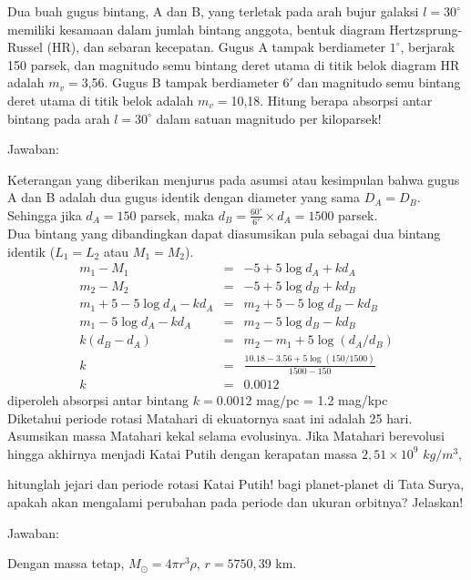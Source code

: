 \documentclass[11pt,fleqn]{exam}
\begin{document}
\begin{questions}
\question Dua buah gugus bintang, A dan B, yang terletak pada arah bujur galaksi $l = 30^{\circ}$ memiliki kesamaan dalam jumlah bintang anggota, bentuk diagram Hertzsprung-Russel (HR), dan sebaran kecepatan. Gugus A tampak berdiameter $1^{\circ}$, berjarak 150 parsek, dan magnitudo semu bintang deret utama di titik belok diagram HR adalah $m_v = $3,56. Gugus B tampak berdiameter $6'$ dan magnitudo semu bintang deret utama di titik belok adalah $m_v = $10,18. Hitung berapa absorpsi antar bintang pada arah $l = 30^{\circ}$ dalam satuan magnitudo per kiloparsek!

Jawaban:

Keterangan yang diberikan menjurus pada asumsi atau kesimpulan bahwa gugus A dan B adalah dua gugus identik dengan diameter yang sama $D_{A} = D_{B}$. Sehingga jika $d_{A} = 150$ parsek, maka $d_{B} = \frac{60'}{6'} \times d_{A} = 1500$ parsek.\\ 
Dua bintang yang dibandingkan dapat diasumsikan pula sebagai dua bintang identik ($L_1 = L_2$ atau $M_1 = M_2$).
\begin{eqnarray*}
m_1 - M_1 &=& -5 + 5 \log d_A + kd_A\\
m_2 - M_2 &=& -5 + 5 \log d_B + kd_B\\
m_1 + 5 - 5 \log d_A - kd_A &=& m_2 + 5 - 5 \log d_B - kd_B\\
m_1 - 5 \log d_A - kd_A &=& m_2 - 5 \log d_B - kd_B\\
k(d_B - d_A) &=& m_2 - m_1 + 5 \log (d_A/d_B)\\
k &=& \frac{10.18 - 3.56 + 5 \log (150/1500)}{1500-150}\\
k &=& 0.0012
\end{eqnarray*}
diperoleh absorpsi antar bintang $k = 0.0012$ mag/pc = 1.2 mag/kpc \\


\question Diketahui periode rotasi Matahari di ekuatornya saat ini adalah 25 hari. Asumsikan massa Matahari kekal selama evolusinya. Jika Matahari berevolusi hingga akhirnya menjadi Katai Putih dengan kerapatan massa $2,51\times 10^9$ $kg/m^3$,
\begin{choices}
\choice hitunglah jejari dan periode rotasi Katai Putih!
\choice bagi planet-planet di Tata Surya, apakah akan mengalami perubahan pada periode dan ukuran orbitnya? Jelaskan!
\end{choices}

Jawaban:

\begin{choices}
\choice Dengan massa tetap, $M_{\odot}=4\pi r^3 \rho$, $r=5750,39$ km.


\end{choices}
\end{questions}
\end{document}
